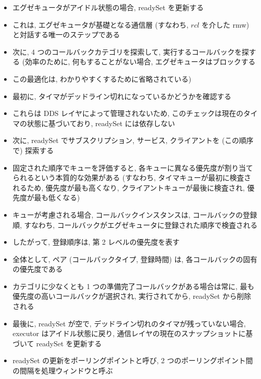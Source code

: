 \begin{frame}{}
    \begin{itemize}
        \item エグゼキュータがアイドル状態の場合, readySet を更新する
\item これは, エグゼキュータが基礎となる通信層 (すなわち,  $r c l$ を介した rmw) と対話する唯一のステップである
\item 次に, 4 つのコールバックカテゴリを探索して, 実行するコールバックを探する (効率のために, 何もすることがない場合, エグゼキュータはブロックする
\item この最適化は, わかりやすくするために省略されている)
\item 最初に, タイマがデッドライン切れになっているかどうかを確認する
\item これらは DDS レイヤによって管理されないため, このチェックは現在のタイマの状態に基づいており, readySet には依存しない
    \end{itemize}
\end{frame}

\begin{frame}{}
    \begin{itemize}
        \item 次に, readySet でサブスクリプション, サービス, クライアントを (この順序で) 探索する
\item 固定された順序でキューを評価すると, 各キューに異なる優先度が割り当てられるという本質的な効果がある (すなわち, タイマキューが最初に検査されるため, 優先度が最も高くなり, クライアントキューが最後に検査され, 優先度が最も低くなる)
\item キューが考慮される場合, コールバックインスタンスは, コールバックの登録順, すなわち, コールバックがエグゼキュータに登録された順序で検査される
\item したがって, 登録順序は, 第 2 レベルの優先度を表す
\item 全体として, ペア (コールバックタイプ, 登録時間) は, 各コールバックの固有の優先度である
    \end{itemize}
\end{frame}

\begin{frame}{}
    \begin{itemize}
        \item カテゴリに少なくとも 1 つの準備完了コールバックがある場合は常に, 最も優先度の高いコールバックが選択され, 実行されてから, readySet から削除される
\item 最後に, readySet が空で, デッドライン切れのタイマが残っていない場合, executor はアイドル状態に戻り, 通信レイヤの現在のスナップショットに基づいて readySet を更新する
\item readySet の更新をポーリングポイントと呼び, 2 つのポーリングポイント間の間隔を処理ウィンドウと呼ぶ
    \end{itemize}
\end{frame}


